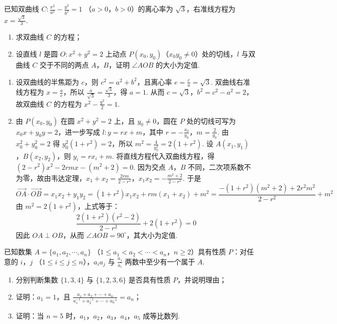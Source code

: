 \begin{problem}
已知双曲线 \(C: \frac{x^2}{a^2} - \frac{y^2}{b^2} = 1\) （\(a > 0\)，\(b > 0\)）的离心率为 \(\sqrt{3}\)，右准线方程为 \(x = \frac{\sqrt{3}}{3}\).

\begin{enumerate}
\item 求双曲线 \(C\) 的方程；
\item 设直线 \(l\) 是圆 \(O: x^{2} + y^{2} = 2\) 上动点 \(P(x_{0}, y_{0})\)（\(x_{0} y_{0} \neq 0\)）处的切线，\(l\) 与双曲线 \(C\) 交于不同的两点 \(A\)，\(B\)，证明 \(\angle AOB\) 的大小为定值.
\end{enumerate}
\end{problem}

\begin{solution}
\begin{enumerate}
\item 设双曲线的半焦距为 \(c\)，则 \(c^2=a^2+b^2\)，且离心率 \(e=\frac ca=\sqrt3\). 双曲线右准线方程为 \(x=\frac ae\)，所以 \(\frac{a}{\sqrt3}=\frac{\sqrt3}{3}\)，得 \(a=1\). 从而 \(c=\sqrt3\)，\(b^2=c^2-a^2=2\)，故双曲线 \(C\) 的方程为 \(x^2-\frac{y^2}{2}=1\).
\item 由 \(P(x_0,y_0)\) 在圆 \(x^2+y^2=2\) 上，且 \(y_0\neq0\)，圆在 \(P\) 处的切线可写为 \(x_0x+y_0y=2\)，进一步写成 \(l:y=rx+m\)，其中 \(r=-\frac{x_0}{y_0}\)，\(m=\frac2{y_0}\). 由 \(x_0^2+y_0^2=2\) 得 \(y_0^2(1+r^2)=2\)，所以 \(m^2=\frac4{y_0^2}=2(1+r^2)\). 设 \(A(x_1,y_1)\)，\(B(x_2,y_2)\)，则 \(y_i=rx_i+m\). 将直线方程代入双曲线方程，得 \((2-r^2)x^2-2rmx-(m^2+2)=0\). 因为交点 \(A\)，\(B\) 不同，二次项系数不为零，故由韦达定理，\(x_1+x_2=\frac{2rm}{2-r^2}\)，\(x_1x_2=-\frac{m^2+2}{2-r^2}\). 于是
\[
\overrightarrow{OA}\cdot\overrightarrow{OB}=x_1x_2+y_1y_2=(1+r^2)x_1x_2+rm(x_1+x_2)+m^2
=\frac{-(1+r^2)(m^2+2)+2r^2m^2}{2-r^2}+m^2
\]
由 \(m^2=2(1+r^2)\)，上式等于：
\[
\frac{2(1+r^2)(r^2-2)}{2-r^2}+2(1+r^2)=0
\]
因此 \(OA\perp OB\)，从而 \(\angle AOB=90^{\circ}\)，其大小为定值.
\end{enumerate}
\end{solution}

\begin{problem}
已知数集 \(A = \{a_{1}, a_{2}, \cdots, a_{n}\}\) （\(1 \leqslant a_{1} < a_{2} < \cdots < a_{n}\)，\(n \geqslant 2\)）具有性质 \(P\)：对任意的 \(i\)，\(j\) （\(1 \leqslant i \leqslant j \leqslant n\)），\(a_{i} a_{j}\) 与 \(\frac{a_{j}}{a_{i}}\) 两数中至少有一个属于 \(A\).

\begin{enumerate}
\item 分别判断集数 \(\{1, 3, 4\}\) 与 \(\{1, 2, 3, 6\}\) 是否具有性质 \(P\)，并说明理由；
\item 证明：\(a_{1}=1\)，且 \(\frac{a_{1}+a_{2}+\cdots+a_{n}}{a_{1}^{-1}+a_{2}^{-1}+\cdots+a_{n}^{-1}}=a_{n}\)；
\item 证明：当 \(n = 5\) 时，\(a_1\)，\(a_2\)，\(a_3\)，\(a_4\)，\(a_5\) 成等比数列.
\end{enumerate}
\end{problem}

